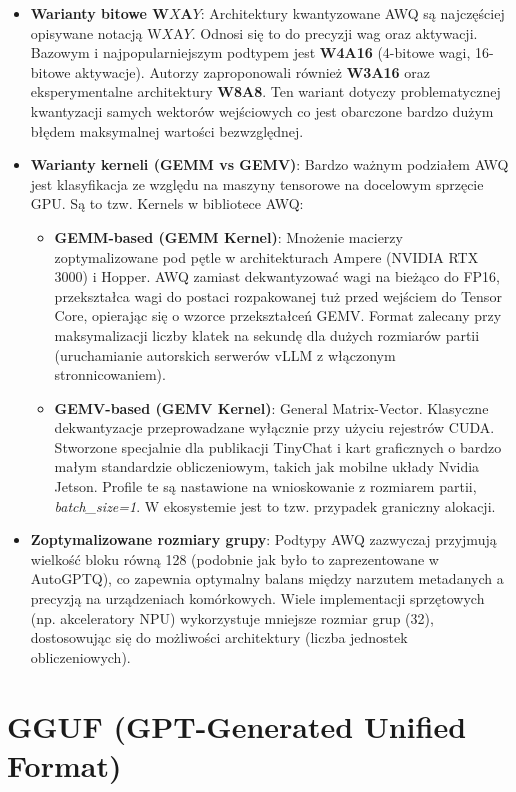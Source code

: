 \begin{itemize}
    \item \textbf{Warianty bitowe W$X$A$Y$}: Architektury kwantyzowane AWQ są najczęściej opisywane notacją W$X$A$Y$. Odnosi się to do precyzji wag oraz aktywacji. Bazowym i najpopularniejszym podtypem jest \textbf{W4A16} (4-bitowe wagi, 16-bitowe aktywacje). Autorzy zaproponowali również \textbf{W3A16} oraz eksperymentalne architektury \textbf{W8A8}. Ten wariant dotyczy problematycznej kwantyzacji samych wektorów wejściowych co jest obarczone bardzo dużym błędem maksymalnej wartości bezwzględnej.
    
    \item \textbf{Warianty kerneli (GEMM vs GEMV)}: Bardzo ważnym podziałem AWQ jest klasyfikacja ze względu na maszyny tensorowe na docelowym sprzęcie GPU. Są to tzw. Kernels w bibliotece AWQ:
    \begin{itemize}
        \item \textbf{GEMM-based (GEMM Kernel)}: Mnożenie macierzy zoptymalizowane pod pętle w architekturach Ampere (NVIDIA RTX 3000) i Hopper. AWQ zamiast dekwantyzować wagi na bieżąco do FP16, przekształca wagi do postaci rozpakowanej tuż przed wejściem do Tensor Core, opierając się o wzorce przekształceń GEMV. Format zalecany przy maksymalizacji liczby klatek na sekundę dla dużych rozmiarów partii (uruchamianie autorskich serwerów vLLM z włączonym stronnicowaniem).
        \item \textbf{GEMV-based (GEMV Kernel)}: General Matrix-Vector. Klasyczne dekwantyzacje przeprowadzane wyłącznie przy użyciu rejestrów CUDA. Stworzone specjalnie dla publikacji TinyChat i kart graficznych o bardzo małym standardzie obliczeniowym, takich jak mobilne układy Nvidia Jetson. Profile te są nastawione na wnioskowanie z rozmiarem partii, \textit{batch\_size=1}. W ekosystemie jest to tzw. przypadek graniczny alokacji.
    \end{itemize}
    \item \textbf{Zoptymalizowane rozmiary grupy}: Podtypy AWQ zazwyczaj przyjmują wielkość bloku równą 128 (podobnie jak było to zaprezentowane w AutoGPTQ), co zapewnia optymalny balans między narzutem metadanych a precyzją na urządzeniach komórkowych. Wiele implementacji sprzętowych (np. akceleratory NPU) wykorzystuje mniejsze rozmiar grup (32), dostosowując się do możliwości architektury (liczba jednostek obliczeniowych).
\end{itemize}

\section{GGUF (GPT-Generated Unified Format)}

